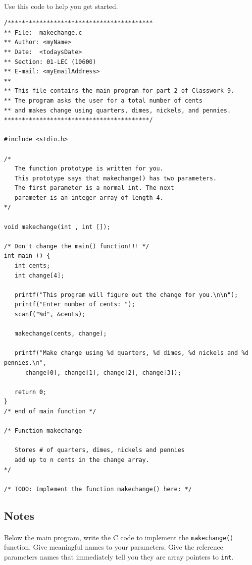 \documentclass[letter,11pt]{article}
\begin{document}
\paragraph{}Use this code to help you get started.
\begin{verbatim}
/*****************************************
** File:  makechange.c
** Author: <myName>
** Date:  <todaysDate>
** Section: 01-LEC (10600)
** E-mail: <myEmailAddress>
**
** This file contains the main program for part 2 of Classwork 9.
** The program asks the user for a total number of cents
** and makes change using quarters, dimes, nickels, and pennies.
*****************************************/

#include <stdio.h>

/*
   The function prototype is written for you.
   This prototype says that makechange() has two parameters.
   The first parameter is a normal int. The next
   parameter is an integer array of length 4.
*/

void makechange(int , int []);

/* Don't change the main() function!!! */
int main () {
   int cents;
   int change[4];

   printf("This program will figure out the change for you.\n\n");
   printf("Enter number of cents: ");
   scanf("%d", &cents);

   makechange(cents, change);

   printf("Make change using %d quarters, %d dimes, %d nickels and %d pennies.\n",
      change[0], change[1], change[2], change[3]);

   return 0;
}
/* end of main function */

/* Function makechange
   
   Stores # of quarters, dimes, nickels and pennies
   add up to n cents in the change array.
*/

/* TODO: Implement the function makechange() here: */
\end{verbatim}

\subsection*{Notes}
\paragraph{}Below the main program, write the C code to implement the \texttt{makechange()} function. Give meaningful names to your parameters. Give the reference parameters names that immediately tell you they are array pointers to \texttt{int}.
\end{document}
